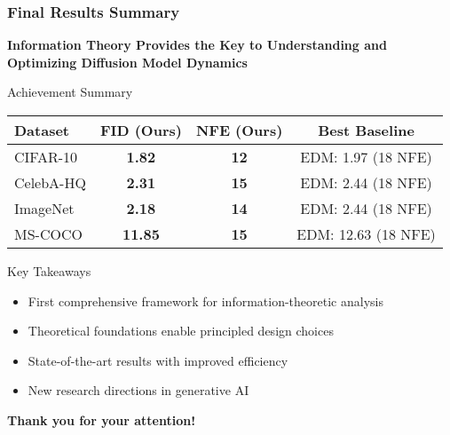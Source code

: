 \documentclass[aspectratio=169]{beamer}
\begin{document}
\begin{frame}
\frametitle{Final Results Summary}
\begin{center}
\Large
\textbf{Information Theory Provides the Key to Understanding and Optimizing Diffusion Model Dynamics}
\end{center}

\vspace{1cm}

\begin{block}{Achievement Summary}
\begin{center}
\begin{tabular}{|l|c|c|c|}
\hline
\textbf{Dataset} & \textbf{FID (Ours)} & \textbf{NFE (Ours)} & \textbf{Best Baseline} \\
\hline
CIFAR-10 & \textbf{1.82} & \textbf{12} & EDM: 1.97 (18 NFE) \\
CelebA-HQ & \textbf{2.31} & \textbf{15} & EDM: 2.44 (18 NFE) \\
ImageNet & \textbf{2.18} & \textbf{14} & EDM: 2.44 (18 NFE) \\
MS-COCO & \textbf{11.85} & \textbf{15} & EDM: 12.63 (18 NFE) \\
\hline
\end{tabular}
\end{center}
\end{block}

\vspace{0.5cm}

\begin{block}{Key Takeaways}
\begin{itemize}
\item \textcolor{mygreen}{First comprehensive framework} for information-theoretic analysis
\item \textcolor{mygreen}{Theoretical foundations} enable principled design choices
\item \textcolor{mygreen}{State-of-the-art results} with improved efficiency
\item \textcolor{mygreen}{New research directions} in generative AI
\end{itemize}
\end{block}

\vspace{0.5cm}

\begin{center}
\Large
\textbf{Thank you for your attention!}
\end{center}
\end{frame}
\end{document}
